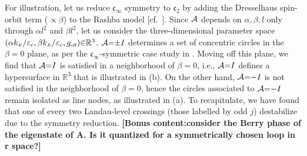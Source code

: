 \documentclass[aps, prb, showpacs, twocolumn, notitlepage, superscriptaddress]{revtex4-1}
\begin{document}
For illustration, let us reduce $\mathfrak{c}_{\infty}$ symmetry to  $\mathfrak{c}_2$  by adding the Dresselhaus spin-orbit term (${\propto} \beta$) to the Rashba model [cf.\ ]. Since ${\cal A}$ depends on $\alpha,\beta,l$ only through $\alpha l^2$ and $\beta l^2$, let us consider the three-dimensional parameter space $(\alpha k_{\scriptscriptstyle{E}}/\varepsilon_c,\beta k_{\scriptscriptstyle{E}}/\varepsilon_c,g_{\scriptscriptstyle{\text{eff}}}){\in} \mathbb{R}^3$.  ${\cal A}{=}{\pm} I$ determines a set of concentric circles in the $\beta{=}0$ plane, as per the $\mathfrak{c}_{\infty}$-symmetric case study in . Moving off this plane, we find that ${\cal A}{=}I$ is satisfied in a  neighborhood of $\beta{=}0$, i.e., ${\cal A}{=}I$ defines a hypersurface in $\mathbb{R}^3$ that is illustrated in (b). On the other hand, ${\cal A}{=}{-}I$ is not satisfied in the neighborhood of $\beta{=}0$, hence the circles associated to ${\cal A}{=}{-}I$ remain isolated as line nodes, as illustrated in (a). To recapitulate, we have found that one of every two Landau-level crossings (those labelled by odd $j$) destabilize due to the symmetry reduction. \textbf{[Bonus content:consider the Berry phase of the eigenstate of A. Is it quantized for a symmetrically chosen loop in r space?]}
\end{document}
